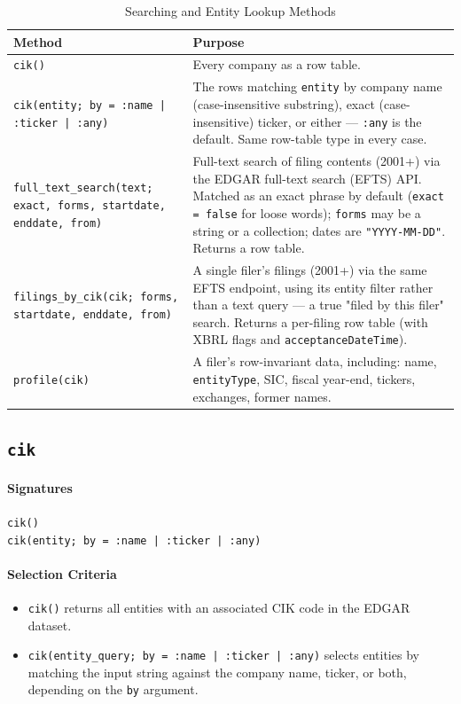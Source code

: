 \documentclass[11pt,a4paper]{report}
\newcommand{\sig}[1]{\medskip\noindent\texttt{#1}\par\medskip}
\begin{document}
\begin{table}[t]
\caption{Searching and Entity Lookup Methods}
\label{tab:searching}
\begin{tabular}{@{}p{}p{}@{}}
\toprule
\textbf{Method} & \textbf{Purpose} \\
\midrule
\texttt{cik()} & Every company as a row table. \\
\texttt{cik(entity; by = :name | :ticker | :any)} & The rows matching \texttt{entity}
  by company name (case-insensitive substring), exact (case-insensitive) ticker, or
  either --- \texttt{:any} is the default. Same row-table type in every case. \\
\texttt{full\_text\_search(text; exact, forms, startdate, enddate, from)} &
  Full-text search of filing contents (2001+) via the EDGAR full-text search
  (EFTS) API. Matched as an exact phrase by default (\texttt{exact = false} for
  loose words); \texttt{forms} may be a string or a collection; dates are
  \texttt{"YYYY-MM-DD"}. Returns a row table. \\
\texttt{filings\_by\_cik(cik; forms, startdate, enddate, from)} &
  A single filer's filings (2001+) via the same EFTS endpoint, using its entity
  filter rather than a text query --- a true "filed by this filer" search.
  Returns a per-filing row table (with XBRL flags and \texttt{acceptanceDateTime}). \\
\texttt{profile(cik)} &
  A filer's row-invariant data, including: name, \texttt{entityType}, SIC, fiscal year-end,
  tickers, exchanges, former names. \\
\bottomrule
\end{tabular}
\end{table}

\subsection{\texttt{cik}}

\paragraph{Signatures}
\begin{description}
  \item[\sig{cik()}] 
  \item[\sig{cik(entity; by = :name | :ticker | :any)}] 
\end{description}



\paragraph{Selection Criteria}
\begin{itemize}
  \item \texttt{cik()} returns all entities with an associated CIK code in the EDGAR dataset.
  \item \texttt{cik(entity\_query; by = :name | :ticker | :any)} selects entities by matching the input string against the company name, ticker, or both, depending on the \texttt{by} argument.
\end{itemize}
\end{document}
